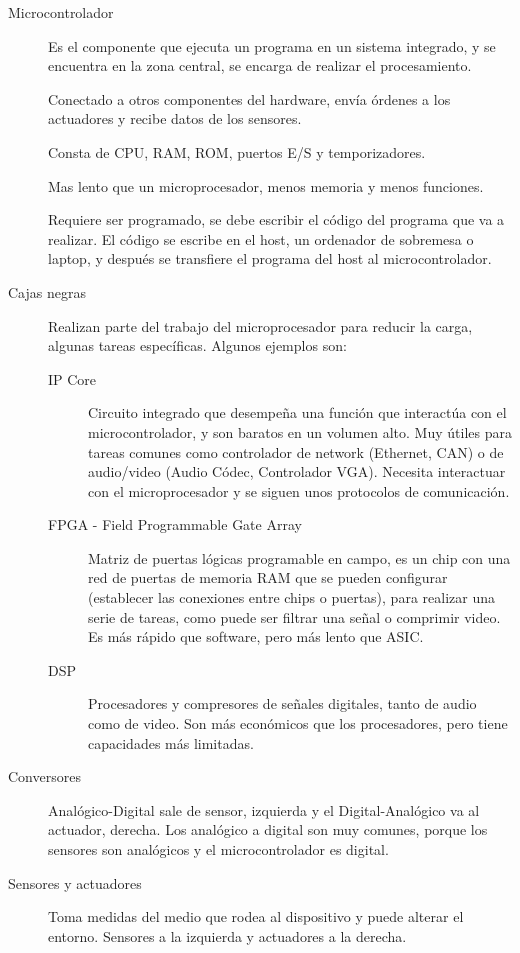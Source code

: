\documentclass[12pt]{report} %
\begin{document}
\begin{description}
	\item[Microcontrolador] Es el componente que ejecuta un programa en un sistema integrado, y se encuentra en la zona central, se encarga de realizar el procesamiento. 
	
	Conectado a otros componentes del hardware, envía órdenes a los actuadores y recibe datos de los sensores. 
	
	Consta de CPU, RAM, ROM, puertos E/S y temporizadores.
	
	Mas lento que un microprocesador, menos memoria y menos funciones.
	
	Requiere ser programado, se debe escribir el código del programa que va a realizar. El código se escribe en el host, un ordenador de sobremesa o laptop, y después se transfiere el programa del host al microcontrolador.
	\item[Cajas negras] Realizan parte del trabajo del microprocesador para reducir la carga, algunas tareas específicas. Algunos ejemplos son:
	\begin{description}
		\item[IP Core] Circuito integrado que desempeña una función que interactúa con el microcontrolador, y son baratos en un volumen alto. Muy útiles para tareas comunes como controlador de network (Ethernet, CAN)  o de audio/video (Audio Códec, Controlador VGA). Necesita interactuar con el microprocesador y se siguen unos protocolos de comunicación. 

		\item[FPGA - Field Programmable Gate Array] Matriz de puertas lógicas programable en campo, es un chip con una red de puertas de memoria RAM que se pueden configurar (establecer las conexiones entre chips o puertas), para realizar una serie de tareas, como puede ser filtrar una señal o comprimir video. Es más rápido que software, pero más lento que ASIC. 

		\item[DSP] Procesadores y compresores de señales digitales, tanto de audio como de video. Son más económicos que los procesadores, pero tiene capacidades más limitadas.

	\end{description}
	\item[Conversores] Analógico-Digital sale de sensor, izquierda y el Digital-Analógico va al actuador, derecha. Los analógico a digital son muy comunes, porque los sensores son analógicos y el microcontrolador es digital.
	\item[Sensores y actuadores] Toma medidas del medio que rodea al dispositivo y puede alterar el entorno. Sensores a la izquierda y actuadores a la derecha.
\end{description}
\end{document}
